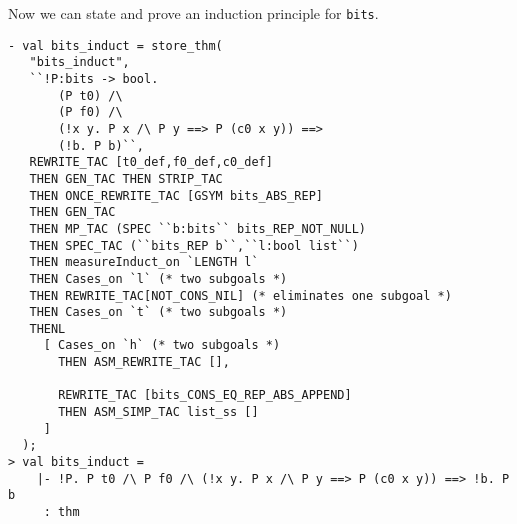 % 

Now we can state and prove an induction principle for \texttt{bits}.
%
\begin{session}
\begin{verbatim}
- val bits_induct = store_thm(
   "bits_induct",
   ``!P:bits -> bool.
       (P t0) /\
       (P f0) /\
       (!x y. P x /\ P y ==> P (c0 x y)) ==>
       (!b. P b)``,
   REWRITE_TAC [t0_def,f0_def,c0_def]
   THEN GEN_TAC THEN STRIP_TAC
   THEN ONCE_REWRITE_TAC [GSYM bits_ABS_REP]
   THEN GEN_TAC
   THEN MP_TAC (SPEC ``b:bits`` bits_REP_NOT_NULL)
   THEN SPEC_TAC (``bits_REP b``,``l:bool list``)
   THEN measureInduct_on `LENGTH l`
   THEN Cases_on `l` (* two subgoals *)
   THEN REWRITE_TAC[NOT_CONS_NIL] (* eliminates one subgoal *)
   THEN Cases_on `t` (* two subgoals *)
   THENL
     [ Cases_on `h` (* two subgoals *)
       THEN ASM_REWRITE_TAC [],

       REWRITE_TAC [bits_CONS_EQ_REP_ABS_APPEND]
       THEN ASM_SIMP_TAC list_ss []
     ]
  );
> val bits_induct =
    |- !P. P t0 /\ P f0 /\ (!x y. P x /\ P y ==> P (c0 x y)) ==> !b. P b
     : thm
\end{verbatim}
\end{session}

